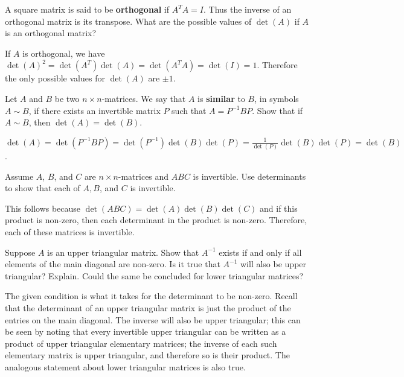 \begin{enumialphparenastyle}
\begin{ex}
  A square matrix is said to be \textbf{orthogonal}%
   if $A^{T}A = I$. Thus the inverse of an
  orthogonal matrix is its transpose. What are the possible values of
  $\det(A)$ if $A$ is an orthogonal matrix?
  \begin{sol}
    If $A$ is orthogonal, we have $\det(A)^2 = \det(A^T)\det(A) =
    \det(A^TA) = \det(I) = 1$. Therefore the only possible values for
    $\det(A)$ are $\pm 1$. 
  \end{sol}
\end{ex}

\begin{ex}
  Let $A$ and $B$ be two $n\times n$-matrices. We say that $A$ is
  \textbf{similar}%
   to $B$, in symbols $A\sim B$, if there
  exists an invertible matrix $P$ such that $A = P^{-1}BP$. Show that
  if $A\sim B$, then $\det(A) = \det(B)$.
  \begin{sol}
    $\det(A) = \det(P^{-1}BP) = \det(P^{-1}) \det(B) \det(P) =
    \frac{1}{\det(P)} \det(B) \det(P) = \det(B)$.
  \end{sol}
\end{ex}

\begin{ex}
  Assume $A$, $B$, and $C$ are $n\times n$-matrices and $ABC$ is
  invertible. Use determinants to show that each of $A,B$, and $C$ is
  invertible.
  \begin{sol}
    This follows because $\det(ABC) = \det(A)\det(B)\det(C)$ and if
    this product is non-zero, then each determinant in the product is
    non-zero. Therefore, each of these matrices is invertible.
  \end{sol}
\end{ex}

\begin{ex}
  Suppose $A$ is an upper triangular matrix. Show that $A^{-1}$ exists
  if and only if all elements of the main diagonal are non-zero. Is it
  true that $A^{-1}$ will also be upper triangular? Explain. Could the
  same be concluded for lower triangular matrices?
  \begin{sol}
    The given condition is what it takes for the determinant to be
    non-zero. Recall that the determinant of an upper triangular
    matrix is just the product of the entries on the main diagonal.
    The inverse will also be upper triangular; this can be seen by
    noting that every invertible upper triangular can be written as a
    product of upper triangular elementary matrices; the inverse of
    each such elementary matrix is upper triangular, and therefore so
    is their product. The analogous statement about lower triangular
    matrices is also true.
  \end{sol}
\end{ex}


\end{enumialphparenastyle}
